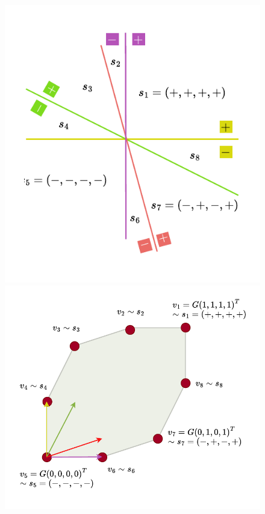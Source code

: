 \begin{figure}[!htb]
    \captionsetup{justification=centering}
    \centering
    
    \begin{minipage}{0.49\linewidth}
        \includegraphics[trim={0 20 0 20},clip, width=0.9\linewidth]{img/chapter_2/sign_vectors_zonotope.pdf}
    \end{minipage}
    \hfill
    \begin{minipage}{0.49\linewidth}
        \hfill
        \includegraphics[trim={0 20 0 20},clip,width=1\linewidth]{img/chapter_2/zonotope_vertices_sign_vectors.pdf}

\end{minipage}
\end{figure}
